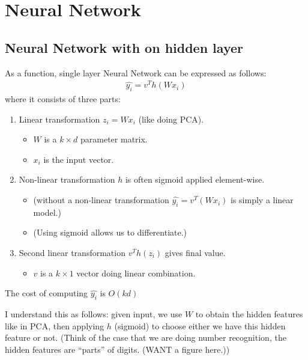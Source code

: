 \setcounter{chapter}{3}
\chapter{Neural Network}

\section{Neural Network with on hidden layer} \label{sec:}

As a function, single layer Neural Network can be expressed as follows:
\begin{align*}
    \hat{y_i} = v^{T}h(Wx_i)
\end{align*}
where it consists of three parts:
\begin{enumerate}
    \item Linear transformation $z_i = Wx_i$ (like doing PCA).
    \begin{itemize}
        \item $W$ is a $k \times d$ parameter matrix.
        \item $x_i$ is the input vector.
    \end{itemize}
    \item Non-linear transformation $h$ is often sigmoid applied element-wise.
    \begin{itemize}
        \item (without a non-linear transformation $\hat{y_i} = v^{T}(Wx_i)$ is simply a linear model.)
        \item (Using sigmoid allows us to differentiate.)
    \end{itemize}
    \item Second linear transformation $v^{T}h(z_i)$ gives final value.
    \begin{itemize}
        \item $v$ is a $k \times 1$ vector doing linear combination.
    \end{itemize}
\end{enumerate}
\begin{remark}
    The cost of computing $\hat{y_i}$ is $O(kd)$
\end{remark}

\begin{intuition}
    I understand this as follows: given input, we use $W$ to obtain the hidden features like in PCA, then applying $h$ (sigmoid) to choose either we have this hidden feature or not. (Think of the case that we are doing number recognition, the hidden features are ``parts'' of digits. (WANT a figure here.))
\end{intuition}

